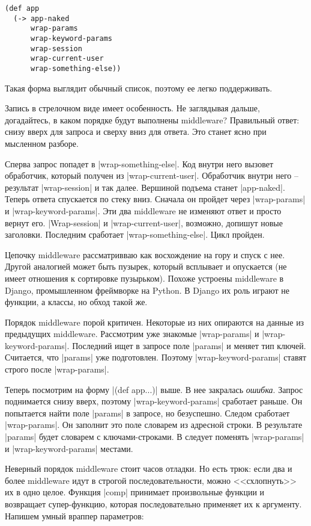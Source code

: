 \begin{verbatim}
(def app
  (-> app-naked
      wrap-params
      wrap-keyword-params
      wrap-session
      wrap-current-user
      wrap-something-else))
\end{verbatim}

Такая форма выглядит обычный список, поэтому ее легко поддерживать.

Запись в стрелочном виде имеет особенность. Не заглядывая дальше, догадайтесь, в
каком порядке будут выполнены middleware? Правильный ответ: снизу вверх для
запроса и сверху вниз для ответа. Это станет ясно при мысленном разборе.

Сперва запрос попадет в \spverb|wrap-something-else|. Код внутри него вызовет
обработчик, который получен из \spverb|wrap-current-user|. Обработчик внутри него –
результат \spverb|wrap-session| и так далее. Вершиной подъема станет
\spverb|app-naked|. Теперь ответа спускается по стеку вниз. Сначала он
пройдет через \spverb|wrap-params| и \spverb|wrap-keyword-params|. Эти два middleware не
изменяют ответ и просто вернут его. \spverb|Wrap-session| и \spverb|wrap-current-user|,
возможно, допишут новые заголовки. Последним сработает \spverb|wrap-something-else|. Цикл пройден.

Цепочку middleware рассматривваю как восхождение на гору и спуск с
нее. Другой аналогией может быть пузырек, который всплывает и опускается (не
имеет отношения к сортировке пузырьком). Похоже устроены middleware в Django, промышленном
фреймворке на Python. В Django их роль играют не функции, а классы, но обход такой же.

Порядок middleware порой критичен. Некоторые из них опираются на данные из
предыдущих middleware. Рассмотрим уже знакомые \spverb|wrap-params| и
\spverb|wrap-keyword-params|. Последний ищет в запросе поле \spverb|params| и
меняет тип ключей. Считается, что \spverb|params| уже подготовлен.
Поэтому \spverb|wrap-keyword-params| ставят строго после \spverb|wrap-params|.

Теперь посмотрим на форму \spverb|(def app...)| выше. В нее закралась \emph{ошибка}. Запрос
поднимается снизу вверх, поэтому \spverb|wrap-keyword-params| сработает раньше. Он
попытается найти поле \spverb|params| в запросе, но безуспешно. Следом сработает
\spverb|wrap-params|. Он заполнит это поле словарем из адресной строки. В результате
\spverb|params| будет словарем с ключами-строками. В следует поменять \spverb|wrap-params| и
\spverb|wrap-keyword-params| местами.

Неверный порядок middleware стоит часов отладки. Но есть трюк: если два и более
middleware идут в строгой последовательности, можно <<схлопнуть>> их в одно
целое. Функция \spverb|comp| принимает произвольные функции и
возвращает супер-функцию, которая последовательно применяет их к
аргументу. Напишем умный враппер параметров:


